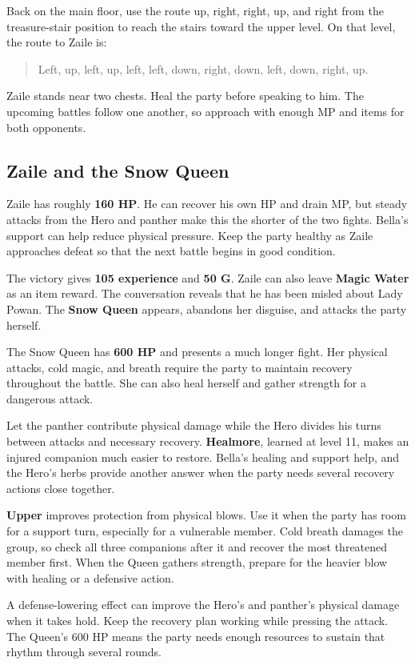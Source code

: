 Back on the main floor, use the route up, right, right, up, and right
from the treasure-stair position to reach the stairs toward the upper
level. On that level, the route to Zaile is:
\begin{quote}
Left, up, left, up, left, left, down, right, down, left, down, right, up.
\end{quote}

Zaile stands near two chests. Heal the party before speaking to him.
The upcoming battles follow one another, so approach with enough MP and
items for both opponents.

\subsection*{Zaile and the Snow Queen}

Zaile has roughly \textbf{160 HP}. He can recover his own HP and drain
MP, but steady attacks from the Hero and panther make this the shorter
of the two fights. Bella's support can help reduce physical pressure.
Keep the party healthy as Zaile approaches defeat so that the next battle
begins in good condition.

The victory gives \textbf{105 experience} and \textbf{50 G}. Zaile
can also leave \textbf{Magic Water} as an item reward. The conversation
reveals that he has been misled about Lady Powan. The \textbf{Snow Queen}
appears, abandons her disguise, and attacks the party herself.

The Snow Queen has \textbf{600 HP} and presents a much longer fight.
Her physical attacks, cold magic, and breath require the party to maintain
recovery throughout the battle. She can also heal herself and gather
strength for a dangerous attack.

Let the panther contribute physical damage while the Hero divides his
turns between attacks and necessary recovery. \textbf{Healmore}, learned
at level 11, makes an injured companion much easier to restore. Bella's
healing and support help, and the Hero's herbs provide another answer
when the party needs several recovery actions close together.

\textbf{Upper} improves protection from physical blows. Use it when
the party has room for a support turn, especially for a vulnerable member.
Cold breath damages the group, so check all three companions after it
and recover the most threatened member first. When the Queen gathers
strength, prepare for the heavier blow with healing or a defensive action.

A defense-lowering effect can improve the Hero's and panther's physical
damage when it takes hold. Keep the recovery plan working while pressing
the attack. The Queen's 600 HP means the party needs enough resources
to sustain that rhythm through several rounds.


